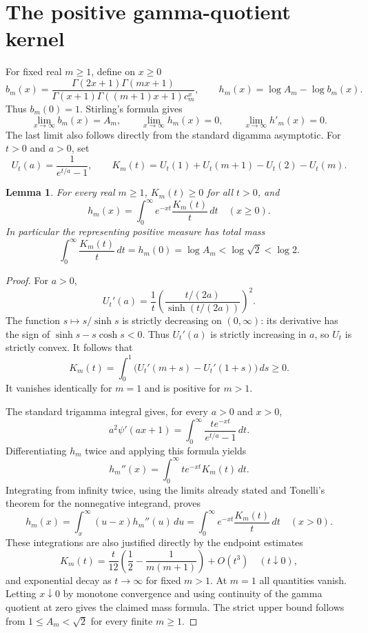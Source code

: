 \documentclass[11pt,a4paper]{article}
\newtheorem{lemma}[theorem]{Lemma}
\begin{document}
\section{The positive gamma-quotient kernel}
For fixed real $m\ge1$, define on $x\ge0$
\[
b_m(x)=\frac{\Gamma(2x+1)\Gamma(mx+1)}
{\Gamma(x+1)\Gamma((m+1)x+1)c_m^x},\qquad
h_m(x)=\log A_m-\log b_m(x).
\]
Thus $b_m(0)=1$. Stirling's formula gives
\[
\lim_{x\to\infty}b_m(x)=A_m,\qquad
\lim_{x\to\infty}h_m(x)=0,\qquad
\lim_{x\to\infty}h'_m(x)=0.
\]
The last limit also follows directly from the standard digamma asymptotic.
For $t>0$ and $a>0$, set
\[
U_t(a)=\frac1{e^{t/a}-1},\qquad
K_m(t)=U_t(1)+U_t(m+1)-U_t(2)-U_t(m).
\]
\begin{lemma}\label{lem:kernel}
For every real $m\ge1$, $K_m(t)\ge0$ for all $t>0$, and
\[
h_m(x)=\int_0^\infty e^{-xt}\frac{K_m(t)}t\,dt\quad(x\ge0).
\]
In particular the representing positive measure has total mass
\[
\int_0^\infty\frac{K_m(t)}t\,dt
=h_m(0)=\log A_m<\log\sqrt2<\log2.
\]
\end{lemma}
\begin{proof}
For $a>0$,
\[
U_t'(a)=\frac1t
\left(\frac{t/(2a)}{\sinh(t/(2a))}\right)^2.
\]
The function $s\mapsto s/\sinh s$ is strictly decreasing on $(0,\infty)$:
its derivative has the sign of $\sinh s-s\cosh s<0$. Thus $U_t'(a)$ is
strictly increasing in $a$, so $U_t$ is strictly convex. It follows that
\[
K_m(t)=\int_0^1\bigl(U_t'(m+s)-U_t'(1+s)\bigr)\,ds\ge0.
\]
It vanishes identically for $m=1$ and is positive for $m>1$.

The standard trigamma integral gives, for every $a>0$ and $x>0$,
\[
a^2\psi'(ax+1)=\int_0^\infty
\frac{t e^{-xt}}{e^{t/a}-1}\,dt.
\]
Differentiating $h_m$ twice and applying this formula yields
\[
h_m''(x)=\int_0^\infty t e^{-xt}K_m(t)\,dt.
\]
Integrating from infinity twice, using the limits already stated and
Tonelli's theorem for the nonnegative integrand, proves
\[
h_m(x)=\int_x^\infty (u-x)h_m''(u)\,du
=\int_0^\infty e^{-xt}\frac{K_m(t)}t\,dt
\quad(x>0).
\]
These integrations are also justified directly by the endpoint estimates
\[
K_m(t)=\frac{t}{12}
\left(\frac12-\frac1{m(m+1)}\right)+O(t^3)
\quad(t\downarrow0),
\]
and exponential decay as $t\to\infty$ for fixed $m>1$.
At $m=1$ all quantities vanish. Letting $x\downarrow0$ by monotone
convergence and using continuity of the gamma quotient at zero gives the
claimed mass formula. The strict upper bound follows from
$1\le A_m<\sqrt2$ for every finite $m\ge1$.
\end{proof}
\end{document}
